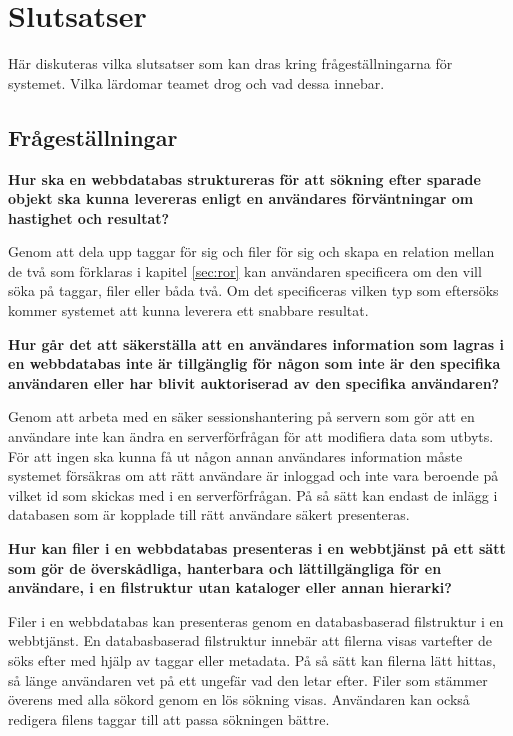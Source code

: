 \chapter{Slutsatser}

Här diskuteras vilka slutsatser som kan dras kring frågeställningarna för systemet. Vilka lärdomar teamet drog och vad dessa innebar.

\section{Frågeställningar}

\textbf{Hur ska en webbdatabas struktureras för att sökning efter sparade objekt ska kunna levereras enligt en användares förväntningar om hastighet och resultat?}

Genom att dela upp taggar för sig och filer för sig och skapa en relation
mellan de två som förklaras i kapitel \ref{sec:ror} kan användaren specificera
om den vill söka på taggar, filer eller båda två. Om det specificeras vilken
typ som eftersöks kommer systemet att kunna leverera ett snabbare resultat.

\textbf{Hur går det att säkerställa att en användares information som lagras i en webbdatabas inte är tillgänglig för någon som inte är den specifika användaren eller har blivit auktoriserad av den specifika användaren?}

Genom att arbeta med en säker sessionshantering på servern som gör att en
användare inte kan ändra en serverförfrågan för att modifiera data som utbyts.
För att ingen ska kunna få ut någon annan användares information måste systemet
försäkras om att rätt användare är inloggad och inte vara beroende på vilket id
som skickas med i en serverförfrågan. På så sätt kan endast de inlägg i
databasen som är kopplade till rätt användare säkert presenteras.

\textbf{Hur kan filer i en webbdatabas presenteras i en webbtjänst på ett sätt som gör de överskådliga,  hanterbara och lättillgängliga för en användare, i en filstruktur utan kataloger eller annan hierarki?}

Filer i en webbdatabas kan presenteras genom en databasbaserad filstruktur i en
webbtjänst. En databasbaserad filstruktur innebär att filerna visas vartefter
de söks efter med hjälp av taggar eller metadata. På så sätt kan filerna lätt
hittas, så länge användaren vet på ett ungefär vad den letar efter. Filer som
stämmer överens med alla sökord genom en lös sökning visas. Användaren kan
också redigera filens taggar till att passa sökningen bättre.

